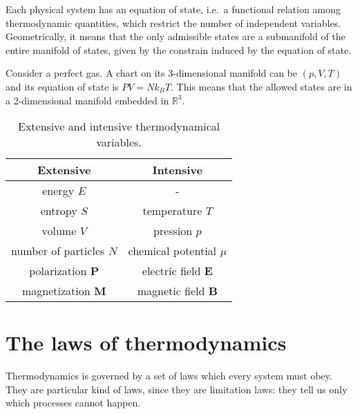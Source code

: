     Each physical system has an equation of state, i.e.~a functional relation among thermodynamic quantities, which restrict the number of independent variables. Geometrically, it means that the only admissible states are a submanifold of the entire manifold of states, given by the constrain induced by the equation of state.

    \begin{example}
        Consider a perfect gas. A chart on its $3$-dimensional manifold can be $(p, V, T)$ and its equation of state is $PV = N k_B T$. This means that the allowed states are in a $2$-dimensional manifold embedded in $\mathbb R^3$.
    \end{example}

    \begin{table}
        \centering
        \begin{tabular}{c | c }
            Extensive & Intensive \\
            \hline
            energy $E$ & - \\ 
            entropy $S$ & temperature $T$ \\ 
            volume $V$ & pression $p$\\ 
            number of particles $N$ & chemical potential $\mu$ \\ 
            polarization $\mathbf P$ & electric field $\mathbf E$ \\ 
            magnetization $\mathbf M$ & magnetic field $\mathbf B$ \\ 
        \end{tabular}
        \caption{Extensive and intensive thermodynamical variables.}
        \label{table:td:1}
    \end{table}

\section{The laws of thermodynamics}

    Thermodynamics is governed by a set of laws which every system must obey. They are particular kind of laws, since they are limitation laws: they tell us only which processes cannot happen. 

